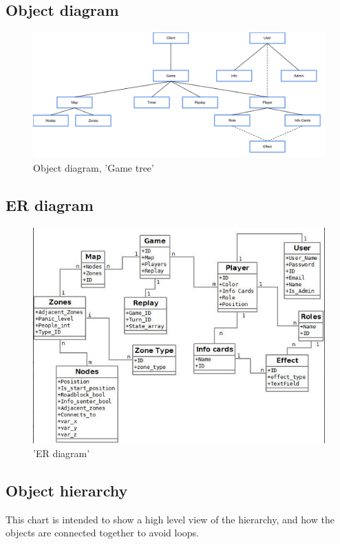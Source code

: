 \subsection{Object diagram}

\begin{figure}[H]
  \centering
    \includegraphics[width=1.0\textwidth]{img/GameTree.png}
  \caption{Object diagram, 'Game tree'} 
  \label{fig:gametree}
\end{figure}


\subsection{ER diagram}
\begin{figure}[H]
  \centering
    \includegraphics[width=1.0\textwidth]{img/erdiagram.png}
  \caption{'ER diagram'} 
  \label{fig:erdiagram}
\end{figure}

\subsection{Object hierarchy}
This chart is intended to show a high level view of the hierarchy, and how the objects are connected together to avoid loops. 

